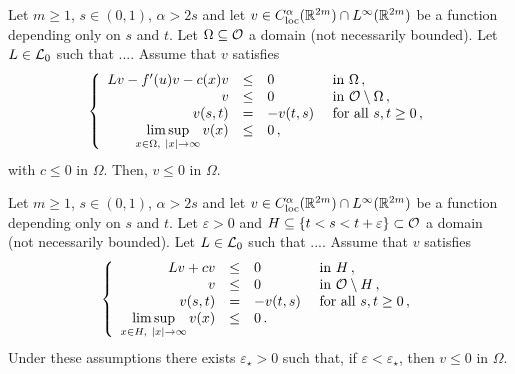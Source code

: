 \begin{proposition}
	\label{Prop:MaximumPrincipleInOVariablesst}
	Let $m\geq 1$, $s \in (0,1)$, $\alpha > 2s$ and let $v\in C^\alpha_{\mathrm{loc}}(\mathbb{R}^{2m})\cap L^\infty(\mathbb{R}^{2m})$ be a function depending only on $s$ and $t$. Let $\Omega \subseteq \mathcal{O}$ a domain (not necessarily bounded). Let $L \in \mathcal{L}_0$ such that .... Assume that $v$ satisfies
	$$
	\left\{\begin{array}{rcll}
	Lv - f'(u)v - c(x)v &\leq & 0 &\textrm{ in } \Omega\,,\\
	v &\leq & 0 &\textrm{ in } \mathcal{O} \setminus \Omega\,,\\
	v(s,t) & = & - v(t,s) &\textrm{ for all } s,t\geq 0\,,\\
	\displaystyle \limsup_{x\in \Omega, \ |x|\to \infty} v(x) &\leq & 0\,,
	\end{array} \right.
	$$
	with $c\leq 0$ in $\Omega$.
	Then, $v \leq 0$ in $\Omega$.
\end{proposition}



\begin{proposition}
	\label{Prop:MaximumPrincipleNarrowDomainsOddVariablesst}
	Let $m\geq 1$, $s \in (0,1)$, $\alpha > 2s$ and let $v\in C^\alpha_{\mathrm{loc}}(\mathbb{R}^{2m})\cap L^\infty(\mathbb{R}^{2m})$ be a function depending only on $s$ and $t$. Let $\varepsilon>0$ and $H \subseteq \{t < s < t + \varepsilon\} \subset \mathcal{O}$ a domain (not necessarily bounded). Let $L \in \mathcal{L}_0$ such that .... Assume that $v$ satisfies
	\begin{equation}
	\label{Eq:AssumptionsMaxPNarrowVariablesst}
	\left\{\begin{array}{rcll}
	Lv + cv&\leq & 0 &\textrm{ in } H\,,\\
	v &\leq & 0 &\textrm{ in } \mathcal{O} \setminus H\,,\\
	v(s,t) & = & - v(t,s) &\textrm{ for all } s,t\geq 0\,,\\
	\displaystyle \limsup_{x\in H, \ |x|\to \infty} v(x) &\leq & 0\,.
	\end{array} \right.
	\end{equation}
	Under these assumptions there exists $\varepsilon_\star>0$ such that, if $\varepsilon<\varepsilon_\star$, then $v \leq 0$ in $\Omega$.
\end{proposition}

